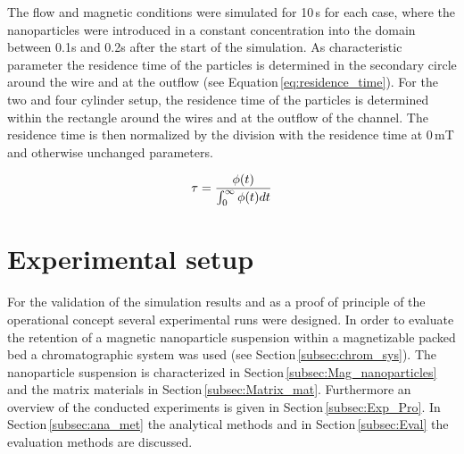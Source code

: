 The flow and magnetic conditions were simulated for 10\,s for each case, where the nanoparticles were introduced in a constant concentration into the domain between 0.1s and 0.2s after the start of the simulation. As characteristic parameter the residence time of the particles is determined in the secondary circle around the wire and at the outflow (see Equation\,\ref{eq:residence_time}). For the two and four cylinder setup, the residence time of the particles is determined within the rectangle around the wires and at the outflow of the channel. The residence time is then normalized by the division with the residence time at 0\,mT and otherwise unchanged parameters. 

\begin{equation}
\label{eq:residence_time}
\centering
\tau = \frac{\phi(t)}{\int_{0}^{\infty}\phi(t)dt}
\end{equation}
% 

\section{Experimental setup}
\label{sec:Exp_setup}
For the validation of the simulation results and as a proof of principle of the operational concept several experimental runs were designed. In order to evaluate the retention of a magnetic nanoparticle suspension within a magnetizable packed bed a chromatographic system was used (see Section\,\ref{subsec:chrom_sys}). The nanoparticle suspension is characterized in Section\,\ref{subsec:Mag_nanoparticles} and the matrix materials in Section\,\ref{subsec:Matrix_mat}. Furthermore an overview of the conducted experiments is given in Section\,\ref{subsec:Exp_Pro}. In Section\,\ref{subsec:ana_met} the analytical methods and in Section\,\ref{subsec:Eval} the evaluation methods are discussed.    


